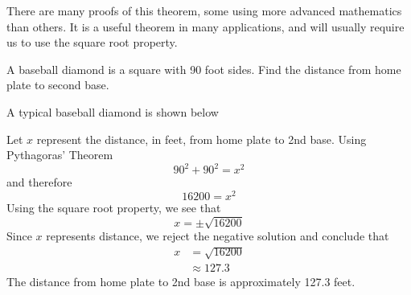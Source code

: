 There are many proofs of this theorem, some using more advanced mathematics than others. It is a useful
theorem in many applications, and will usually require us to use the square root property.

\begin{myexample}
A baseball diamond is a square with 90 foot sides. Find the distance from home plate to second base.
\end{myexample}
\begin{myProof}
	A typical baseball diamond is shown below
	\begin{center}
	\end{center}
		
	Let $x$ represent the distance, in feet, from home plate to 2nd base. Using Pythagoras' Theorem
	\[
		90^2+90^2 = x^2
	\]
	and therefore
	\[
		16200 = x^2
	\]
	Using the square root property, we see that
	\[
		x = \pm \sqrt{16200}
	\]
	Since $x$ represents distance, we reject the negative \gls{solution} and conclude that
	\begin{align*}
		x & =  \sqrt{16200} \\
		  & \approx  127.3  
	\end{align*} 
	The distance from home plate to 2nd base is approximately 127.3 feet.
\end{myProof} 

